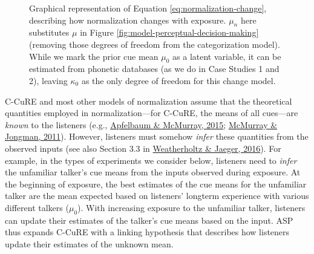 \documentclass[
  11pt,
  english,
  man,floatsintext]{apa6}
\begin{document}
\begin{figure}
\centering
\caption{Graphical representation of Equation \ref{eq:normalization-change}, describing how normalization changes with exposure. $\mu_n$ here substitutes $\mu$ in Figure \ref{fig:model-perceptual-decision-making} (removing those degrees of freedom from the categorization model). While we mark the prior cue mean $\mu_0$ as a latent variable, it can be estimated from phonetic databases (as we do in  Case Studies 1 and 2), leaving $\kappa_0$ as the only degree of freedom for this change model.\label{fig:graphical-model-changes-normalization}}
\end{figure}

C-CuRE and most other models of normalization assume that the theoretical quantities employed in normalization---for C-CuRE, the means of all cues---are \emph{known} to the listeners (e.g., \protect\hyperlink{ref-apfelbaum-mcmurray2015}{Apfelbaum \& McMurray, 2015}; \protect\hyperlink{ref-mcmurray-jongman2011}{McMurray \& Jongman, 2011}). However, listeners must somehow \emph{infer} these quantities from the observed inputs (see also Section 3.3 in \protect\hyperlink{ref-weatherholtz-jaeger2016}{Weatherholtz \& Jaeger, 2016}). For example, in the types of experiments we consider below, listeners need to \emph{infer} the unfamiliar talker's cue means from the inputs observed during exposure. At the beginning of exposure, the best estimates of the cue means for the unfamiliar talker are the mean expected based on listeners' longterm experience with various different talkers (\(\mu_0\)). With increasing exposure to the unfamiliar talker, listeners can update their estimates of the talker's cue means based on the input. ASP thus expands C-CuRE with a linking hypothesis that describes how listeners update their estimates of the unknown mean.
\end{document}
